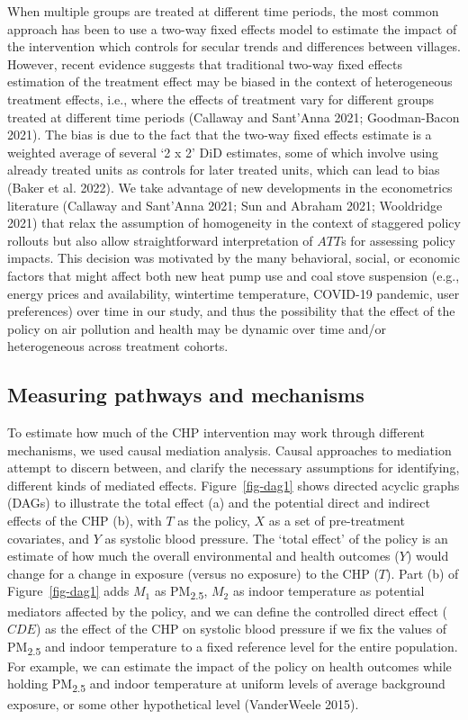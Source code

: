 \documentclass[
  letterpaper,
  DIV=11,
  numbers=noendperiod]{scrartcl}
\begin{document}
When multiple groups are treated at different time periods, the most
common approach has been to use a two-way fixed effects model to
estimate the impact of the intervention which controls for secular
trends and differences between villages. However, recent evidence
suggests that traditional two-way fixed effects estimation of the
treatment effect may be biased in the context of heterogeneous treatment
effects, i.e., where the effects of treatment vary for different groups
treated at different time periods (Callaway and Sant'Anna 2021;
Goodman-Bacon 2021). The bias is due to the fact that the two-way fixed
effects estimate is a weighted average of several `2 x 2' DiD estimates,
some of which involve using already treated units as controls for later
treated units, which can lead to bias (Baker et al. 2022). We take
advantage of new developments in the econometrics literature (Callaway
and Sant'Anna 2021; Sun and Abraham 2021; Wooldridge 2021) that relax
the assumption of homogeneity in the context of staggered policy
rollouts but also allow straightforward interpretation of \(ATT\)s for
assessing policy impacts. This decision was motivated by the many
behavioral, social, or economic factors that might affect both new heat
pump use and coal stove suspension (e.g., energy prices and
availability, wintertime temperature, COVID-19 pandemic, user
preferences) over time in our study, and thus the possibility that the
effect of the policy on air pollution and health may be dynamic over
time and/or heterogeneous across treatment cohorts.

\subsection{Measuring pathways and
mechanisms}\label{measuring-pathways-and-mechanisms}

To estimate how much of the CHP intervention may work through different
mechanisms, we used causal mediation analysis. Causal approaches to
mediation attempt to discern between, and clarify the necessary
assumptions for identifying, different kinds of mediated effects.
Figure~\ref{fig-dag1} shows directed acyclic graphs (DAGs) to illustrate
the total effect (a) and the potential direct and indirect effects of
the CHP (b), with \(T\) as the policy, \(X\) as a set of pre-treatment
covariates, and \(Y\) as systolic blood pressure. The `total effect' of
the policy is an estimate of how much the overall environmental and
health outcomes (\(Y\)) would change for a change in exposure (versus no
exposure) to the CHP (\(T\)). Part (b) of Figure~\ref{fig-dag1} adds
\(M_{1}\) as PM\textsubscript{2.5}, \(M_{2}\) as indoor temperature as
potential mediators affected by the policy, and we can define the
controlled direct effect (\(CDE\)) as the effect of the CHP on systolic
blood pressure if we fix the values of PM\textsubscript{2.5} and indoor
temperature to a fixed reference level for the entire population. For
example, we can estimate the impact of the policy on health outcomes
while holding PM\textsubscript{2.5} and indoor temperature at uniform
levels of average background exposure, or some other hypothetical level
(VanderWeele 2015).
\end{document}
